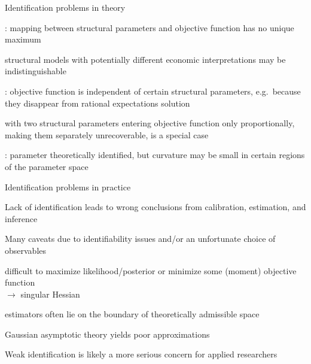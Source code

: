 \documentclass[handout,usepdftitle=false,xcolor=dvipsnames,aspectratio=169]{beamer}
\begin{document}
\renewcommand{\Source}{\textcite{CanovaSala2009}}
\begin{frame}{Identification problems in theory}
  \begin{wenumerate}
    \item {}: mapping between structural parameters and objective function has no unique maximum
    \item[$\Rightarrow$] structural models with potentially different economic interpretations may be indistinguishable
    \item {}: objective function is independent of certain structural parameters, e.g.\ because they disappear from rational expectations solution
    \item[$\Rightarrow$]  with two structural parameters entering objective function only proportionally, making them separately unrecoverable, is a special case
    \item {}: parameter theoretically identified, but curvature may be small in certain regions of the parameter space
  \end{wenumerate}
\end{frame}

\begin{frame}{Identification problems in practice}
  \begin{witemize}
    \item Lack of identification leads to wrong conclusions from calibration, estimation, and
    inference
    \item Many caveats due to identifiability issues and/or an unfortunate choice of observables
    \begin{witemize}
      \item difficult to maximize likelihood/posterior or minimize some (moment) objective
      function\\
      $\rightarrow$ singular Hessian
      \item estimators often lie on the boundary of theoretically admissible space
      \item Gaussian asymptotic theory yields poor approximations
    \end{witemize}
    \item Weak identification is likely a more serious concern for applied researchers
  \end{witemize}
\end{frame}
\end{document}
